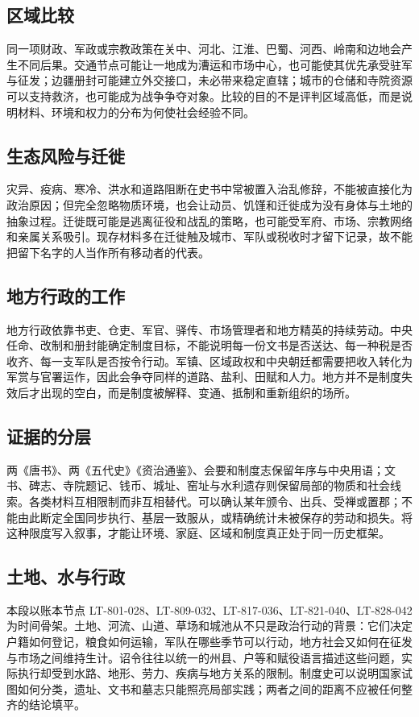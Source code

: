 \subsection{区域比较}
同一项财政、军政或宗教政策在关中、河北、江淮、巴蜀、河西、岭南和边地会产生不同后果。交通节点可能让一地成为漕运和市场中心，也可能使其优先承受驻军与征发；边疆册封可能建立外交接口，未必带来稳定直辖；城市的仓储和寺院资源可以支持救济，也可能成为战争争夺对象。比较的目的不是评判区域高低，而是说明材料、环境和权力的分布为何使社会经验不同。

\subsection{生态风险与迁徙}
灾异、疫病、寒冷、洪水和道路阻断在史书中常被置入治乱修辞，不能被直接化为政治原因；但完全忽略物质环境，也会让动员、饥馑和迁徙成为没有身体与土地的抽象过程。迁徙既可能是逃离征役和战乱的策略，也可能受军府、市场、宗教网络和亲属关系吸引。现存材料多在迁徙触及城市、军队或税收时才留下记录，故不能把留下名字的人当作所有移动者的代表。

\subsection{地方行政的工作}
地方行政依靠书吏、仓吏、军官、驿传、市场管理者和地方精英的持续劳动。中央任命、改制和册封能确定制度目标，不能说明每一份文书是否送达、每一种税是否收齐、每一支军队是否按令行动。军镇、区域政权和中央朝廷都需要把收入转化为军赏与官署运作，因此会争夺同样的道路、盐利、田赋和人力。地方并不是制度失效后才出现的空白，而是制度被解释、变通、抵制和重新组织的场所。

\subsection{证据的分层}
两《唐书》、两《五代史》《资治通鉴》、会要和制度志保留年序与中央用语；文书、碑志、寺院题记、钱币、城址、窑址与水利遗存则保留局部的物质和社会线索。各类材料互相限制而非互相替代。可以确认某年颁令、出兵、受禅或置郡；不能由此断定全国同步执行、基层一致服从，或精确统计未被保存的劳动和损失。将这种限度写入叙事，才能让环境、家庭、区域和制度真正处于同一历史框架。
\subsection{土地、水与行政}
本段以账本节点 LT-801-028、LT-809-032、LT-817-036、LT-821-040、LT-828-042 为时间骨架。土地、河流、山道、草场和城池从不只是政治行动的背景：它们决定户籍如何登记，粮食如何运输，军队在哪些季节可以行动，地方社会又如何在征发与市场之间维持生计。诏令往往以统一的州县、户等和赋役语言描述这些问题，实际执行却受到水路、地形、劳力、疾病与地方关系的限制。制度史可以说明国家试图如何分类，遗址、文书和墓志只能照亮局部实践；两者之间的距离不应被任何整齐的结论填平。

